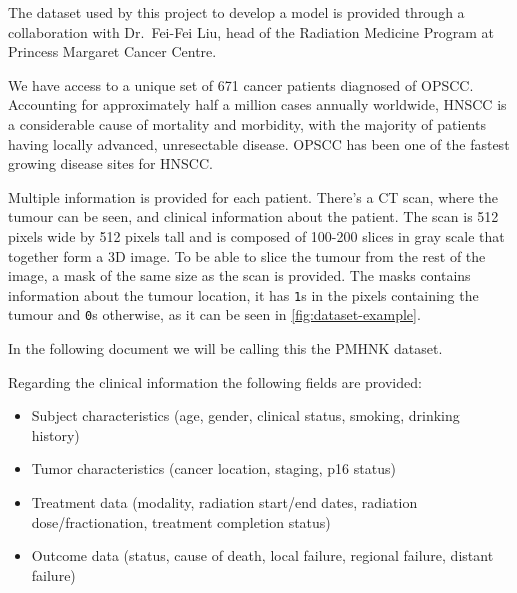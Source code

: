 
The dataset used by this project to develop a model is provided through a 
collaboration with Dr.~Fei-Fei Liu, head of the Radiation Medicine Program at Princess
Margaret Cancer Centre.

We have access to a unique set of 671 cancer patients diagnosed of \gls{OPSCC}. Accounting
for approximately half a million cases annually worldwide, \gls{HNSCC} 
is a considerable cause of mortality and morbidity, with the majority of patients having
locally advanced, unresectable disease. \gls{OPSCC} has been one of the fastest growing 
disease sites for \gls{HNSCC}.
~\cite{medical:ct-based-radiomic-signature}

Multiple information is provided for each patient. There's a \gls{CT} scan, where the tumour 
can be seen, and clinical information about the patient. The scan is 512 pixels wide by 512 
pixels tall and is composed of 100-200 slices in gray scale that together form a 3D image. 
To be able to slice the tumour from the rest of the image, a mask of the same size as the scan 
is provided. The masks contains information about the tumour location, it has \texttt{1}s 
in the pixels containing the tumour and \texttt{0}s
otherwise, as it can be seen in \autoref{fig:dataset-example}.

In the following document we will be calling this the \gls{PMHNK} dataset.

Regarding the clinical information the following fields are provided:
\begin{itemize}
  \item Subject characteristics (age, gender, clinical status, smoking, drinking history)
  \item Tumor characteristics (cancer location, staging, p16 status)
  \item Treatment data (modality, radiation start/end dates, radiation dose/fractionation, 
  treatment completion status)
  \item Outcome data (status, cause of death, local failure, regional failure, distant failure)
\end{itemize}

